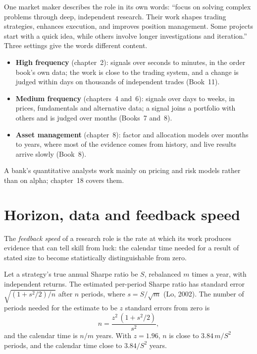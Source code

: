 One market maker describes the role in its own words:  ``focus on solving complex problems
through deep, independent research. Their work shapes trading strategies, enhances execution, and improves position
management. Some projects start with a quick idea, while others involve longer investigations and iteration.'' Three
settings give the words different content.
\begin{itemize}
\item \textbf{High frequency} (chapter~2): signals over seconds to minutes, in the order book's own data; the work is
close to the trading system, and a change is judged within days on thousands of independent trades (Book~11).
\item \textbf{Medium frequency} (chapters~4 and~6): signals over days to weeks, in prices, fundamentals and alternative
data; a signal joins a portfolio with others and is judged over months (Books~7 and~8).
\item \textbf{Asset management} (chapter~8): factor and allocation models over months to years, where most of the
evidence comes from history, and live results arrive slowly (Book~8).
\end{itemize}
A bank's quantitative analysts work mainly on pricing and risk models rather than on alpha; chapter~18 covers them.

\section{Horizon, data and feedback speed}

\begin{definition}\label{def:in:quant-researcher:feedback}
The \emph{feedback speed} of a research role is the rate at which its work produces evidence that
can tell skill from luck: the calendar time needed for a result of stated size to become statistically distinguishable
from zero.
\end{definition}

\begin{method}\label{met:in:quant-researcher:time}
Let a strategy's true annual Sharpe ratio be $S$, rebalanced $m$ times a year, with independent returns. The estimated
per-period Sharpe ratio has standard error $\sqrt{(1+s^2/2)/n}$ after $n$ periods, where $s=S/\sqrt m$ (Lo, 2002). The
number of periods needed for the estimate to be $z$ standard errors from zero is
\[
n=\frac{z^2\,(1+s^2/2)}{s^2},
\]
and the calendar time is $n/m$ years. With $z=1.96$, $n$ is close to $3.84\,m/S^2$ periods, and the calendar time close to
$3.84/S^2$ years.
\end{method}

